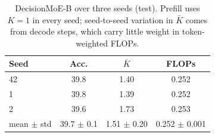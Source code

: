 \begin{table}[t]
\centering
\small
\begin{tabular}{lccc}
\toprule
Seed & Acc. & $\bar K$ & FLOPs \\
\midrule
42 & 39.8 & 1.40 & 0.252 \\
1 & 39.8 & 1.39 & 0.252 \\
2 & 39.6 & 1.73 & 0.253 \\
mean $\pm$ std & 39.7 $\pm$ 0.1 & 1.51 $\pm$ 0.20 & 0.252 $\pm$ 0.001 \\
\bottomrule
\end{tabular}
\caption{DecisionMoE-B over three seeds (test). Prefill uses $K{=}1$ in every seed; seed-to-seed variation in $\bar K$ comes from decode steps, which carry little weight in token-weighted FLOPs.}
\label{tab:seeds}
\end{table}
